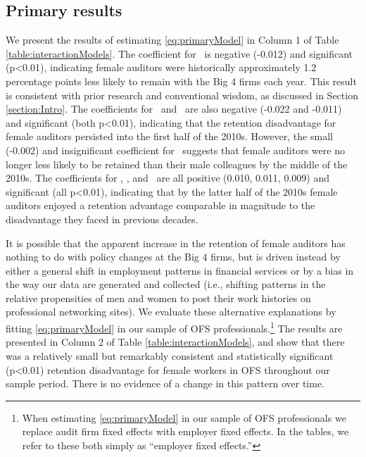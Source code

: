 \documentclass[11pt]{article}
\begin{document}
    \subsection{Primary results}\label{section:primaryResults}
        We present the results of estimating \ref{eq:primaryModel} in Column 1 of Table \ref{table:interactionModels}. The coefficient for \FEMALExPREX\ is negative (-0.012) and significant (p<0.01), indicating female auditors were historically approximately 1.2 percentage points less likely to remain with the Big 4 firms each year. This result is consistent with prior research and conventional wisdom, as discussed in Section \ref{section:Intro}. The coefficients for \FEMALExXtoXI\ and \FEMALExXIItoXIII\ are also negative (-0.022 and -0.011) and significant (both p<0.01), indicating that the retention disadvantage for female auditors persisted into the first half of the 2010s. However, the small (-0.002) and insignificant coefficient for \FEMALExXIVtoXV\ suggests that female auditors were no longer less likely to be retained than their male colleagues by the middle of the 2010s. The coefficients for \FEMALExXVItoXVII, \FEMALExXVIIItoXIX, and \FEMALExPOSTXIX\ are all positive (0.010, 0.011, 0.009) and significant (all p<0.01), indicating that by the latter half of the 2010s female auditors enjoyed a retention advantage comparable in magnitude to the disadvantage they faced in previous decades. 

        It is possible that the apparent increase in the retention of female auditors has nothing to do with policy changes at the Big 4 firms, but is driven instead by either a general shift in employment patterns in financial services or by a bias in the way our data are generated and collected (i.e., shifting patterns in the relative propensities of men and women to post their work histories on professional networking sites). We evaluate these alternative explanations by fitting \ref{eq:primaryModel} in our sample of OFS professionals.\footnote{When estimating \ref{eq:primaryModel} in our sample of OFS professionals we replace audit firm fixed effects with employer fixed effects. In the tables, we refer to these both simply as ``employer fixed effects.''} The results are presented in Column 2 of Table \ref{table:interactionModels}, and show that there was a relatively small but remarkably consistent and statistically significant (p<0.01) retention disadvantage for female workers in OFS throughout our sample period. There is no evidence of a change in this pattern over time. 
        
\end{document}
